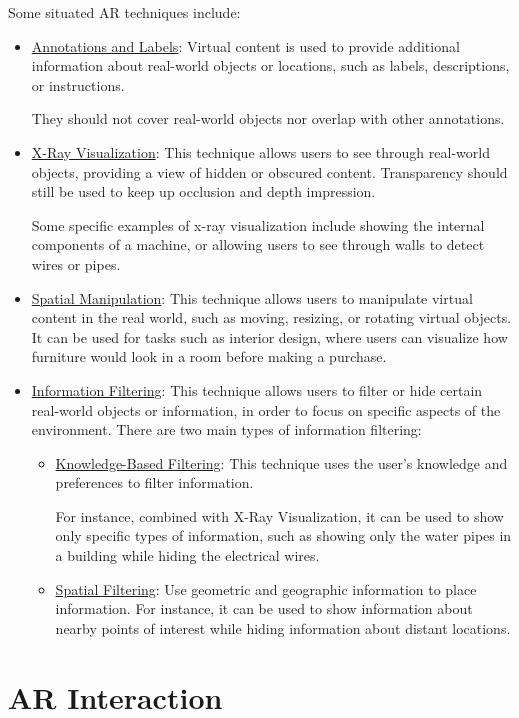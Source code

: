 Some situated AR techniques include:
\begin{itemize}
    \item \ul{Annotations and Labels}: Virtual content is used to provide additional information about real-world objects or locations, such as labels, descriptions, or instructions.
    
    They should not cover real-world objects nor overlap with other annotations.

    \item \ul{X-Ray Visualization}: This technique allows users to see through real-world objects, providing a view of hidden or obscured content. Transparency should still be used to keep up occlusion and depth impression.

    Some specific examples of x-ray visualization include showing the internal components of a machine, or allowing users to see through walls to detect wires or pipes.
    \item \ul{Spatial Manipulation}: This technique allows users to manipulate virtual content in the real world, such as moving, resizing, or rotating virtual objects. It can be used for tasks such as interior design, where users can visualize how furniture would look in a room before making a purchase.
    \item \ul{Information Filtering}: This technique allows users to filter or hide certain real-world objects or information, in order to focus on specific aspects of the environment. There are two main types of information filtering:
    \begin{itemize}
        \item \ul{Knowledge-Based Filtering}: This technique uses the user's knowledge and preferences to filter information.
        
        For instance, combined with X-Ray Visualization, it can be used to show only specific types of information, such as showing only the water pipes in a building while hiding the electrical wires.

        
        \item \ul{Spatial Filtering}: Use geometric and geographic information to place information. For instance, it can be used to show information about nearby points of interest while hiding information about distant locations.
    \end{itemize}
\end{itemize}


\section{AR Interaction}

